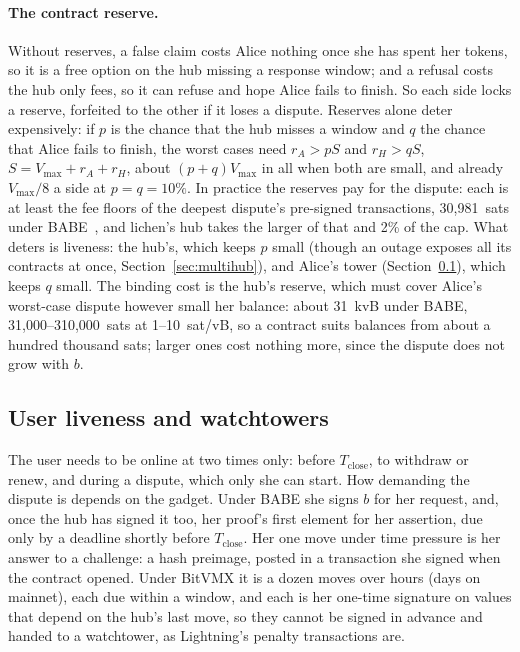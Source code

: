 \documentclass[11pt]{article}
\newcommand{\vmax}{V_{\max}}
\newcommand{\Tc}{T_{\mathrm{close}}}
\begin{document}
\paragraph{The contract reserve.} Without reserves, a false claim costs
Alice nothing once she has spent her tokens, so it is a free option on
the hub missing a response window; and a refusal costs the hub only
fees, so it can refuse and hope Alice fails to finish. So each side
locks a reserve, forfeited to the other if it loses a dispute. Reserves
alone deter expensively: if $p$ is the chance that the hub misses a
window and $q$ the chance that Alice fails to finish, the worst cases
need $r_A > pS$ and $r_H > qS$, $S = \vmax + r_A + r_H$, about
$(p + q)\vmax$ in all when both are small, and already $\vmax/8$ a side
at $p = q = 10\%$. In practice the reserves pay for the dispute: each is
at least the fee floors of the deepest dispute's pre-signed
transactions, 30,981~sats under BABE~\cite[\S 9]{lichenbuilt}, and
lichen's hub takes the larger of that and 2\% of the cap. What deters is
liveness: the hub's, which keeps $p$ small (though an outage exposes all
its contracts at once, Section~\ref{sec:multihub}), and Alice's tower
(Section~\ref{sec:watch}), which keeps $q$ small. The binding cost is
the hub's reserve, which must cover Alice's worst-case dispute however
small her balance: about 31~kvB under BABE, 31,000--310,000~sats at
1--10~sat/vB, so a contract suits balances from about a hundred thousand
sats; larger ones cost nothing more, since the dispute does not grow
with $b$.

\subsection{User liveness and watchtowers}
\label{sec:watch}

The user needs to be online at two times only: before $\Tc$, to withdraw or
renew, and during a dispute, which only she can start. How demanding the
dispute is depends on the gadget. Under BABE she signs $b$ for her
request, and, once the hub has signed it too, her proof's first element
for her assertion, due only by a deadline shortly before $\Tc$. Her one
move under time pressure is her answer to a challenge: a hash preimage,
posted in a transaction she signed when the contract opened. Under
BitVMX it is a dozen moves over hours (days on mainnet), each due within
a window, and each is her one-time signature on values that depend on
the hub's last move, so they cannot be signed in advance and handed to a
watchtower, as Lightning's penalty transactions are.
\end{document}
